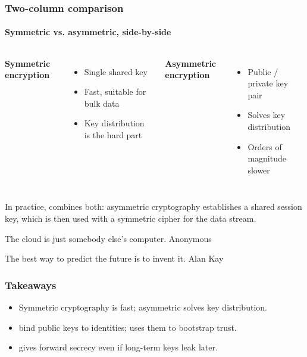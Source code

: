 \documentclass[aspectratio=169]{beamer}
\begin{document}
\begin{frame}
\frametitle{Two-column comparison}
\framesubtitle{Symmetric vs. asymmetric, side-by-side}

\begin{columns}[T]
    \textbf{Symmetric encryption}
    \begin{itemize}
      \item Single shared key
      \item Fast, suitable for bulk data
      \item Key distribution is the hard part
    \end{itemize}
    \textbf{Asymmetric encryption}
    \begin{itemize}
      \item Public / private key pair
      \item Solves key distribution
      \item Orders of magnitude slower
    \end{itemize}
\end{columns}

\vspace{1em}
In practice,  combines both: asymmetric cryptography
establishes a shared session key, which is then used with a symmetric
cipher for the data stream.
\end{frame}



\hsgquote
  {The cloud is just somebody else's computer.}
  {Anonymous}

\hsgquoteinverted
  {The best way to predict the future is to invent it.}
  {Alan Kay}


\begin{frame}
\frametitle{Takeaways}

\begin{itemize}
  \setlength\itemsep{0.55em}
  \item Symmetric cryptography is fast; asymmetric solves key distribution.
  \item {} bind public keys to identities;
         uses them to bootstrap trust.
  \item {} gives forward secrecy even if long-term
        keys leak later.
\end{itemize}
\end{frame}

\hsgclosing
\end{document}
